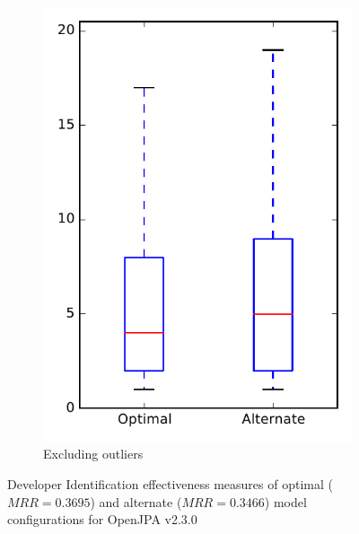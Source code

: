 \begin{figure}
\begin{subfigure}{.4\textwidth}
        \includegraphics[height=0.4\textheight]{figures/combo/dit_rq1_openjpa_no_outlier}
        \caption{Excluding outliers}\label{fig:combo:dit:rq1:openjpa_no_outlier}
    \end{subfigure}
\caption[Developer Identification effectiveness measures of optimal and alternate model configurations for OpenJPA v2.3.0]%
{Developer Identification effectiveness measures of optimal ($MRR=0.3695$) and alternate ($MRR=0.3466$) model configurations for OpenJPA v2.3.0}
\label{fig:combo:dit:rq1:openjpa}
\end{figure}
